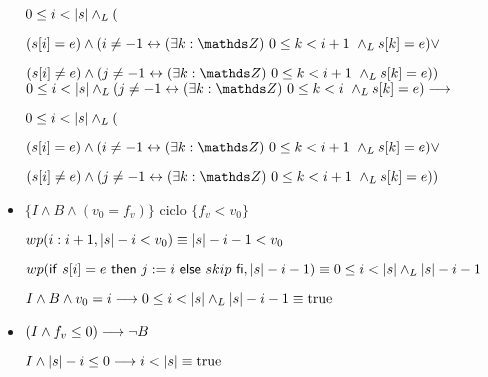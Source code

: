 \documentclass{article}
\begin{document}
\begin{itemize}
    $0 \leq i < |s| \land _L ( $

    $(s[i] = e) \wedge (i \neq -1 \Iff \existe{k}{0}{i+1} \yLuego s[k] = e) \vee$

    $(s[i] \neq e) \wedge (j \neq -1 \Iff \existe{k}{0}{i+1} \yLuego s[k] = e))$ \\

    $0 \leq i < \longitud{s} \yLuego (j \neq -1 \Iff \existe{k}{0}{i} \yLuego s[k] = e) \implica$

    $0 \leq i < |s| \land _L ( $

    $(s[i] = e) \wedge (i \neq -1 \Iff \existe{k}{0}{i+1} \yLuego s[k] = e) \vee$

    $(s[i] \neq e) \wedge (j \neq -1 \Iff \existe{k}{0}{i+1} \yLuego s[k] = e))$ \equiv \True \\

    \item $\{I \wedge B \wedge (v_{0} = f_{v})\}$ ciclo $\{f_{v} < v_{0}\}$
    
    $wp(i:i+1, |s|-i<v_{0}) \equiv |s|-i-1<v_{0}$

    $wp(\mathsf{if}\ s[i]=e\ \mathsf{then}\ j:=i\ \mathsf{else}\ skip\ \mathsf{fi}, |s|-i-1) \equiv 0 \leq i < |s| \land _L |s|-i-1$

    $I \wedge B \wedge v_{0} = i \longrightarrow 0 \leq i < |s| \land _L |s|-i-1 \equiv \mathrm{true}$

    \item $(I \wedge f_{v} \leq 0) \longrightarrow \neg B$

    $I \wedge |s|-i \leq 0 \longrightarrow i < |s| \equiv \mathrm{true}$
\end{itemize}
\end{document}
